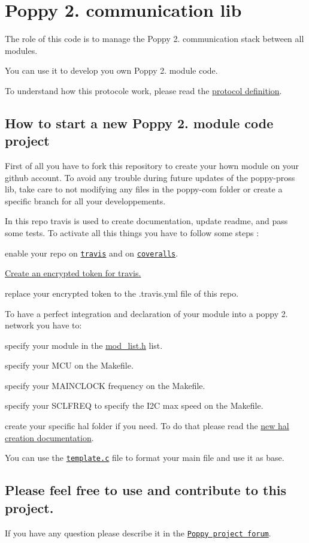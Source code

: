 \section*{Poppy 2. communication lib }

The role of this code is to manage the Poppy 2. communication stack between all modules.

You can use it to develop you own Poppy 2. module code.

To understand how this protocole work, please read the \hyperlink{md_doc_protocol_definition}{protocol definition}.

\subsection*{How to start a new Poppy 2. module code project }

First of all you have to fork this repository to create your hown module on your github account. To avoid any trouble during future updates of the poppy-\/pross lib, take care to not modifying any files in the poppy-\/com folder or create a specific branch for all your developpements. 



In this repo travis is used to create documentation, update readme, and pass some tests. To activate all this things you have to follow some steps \-:
\begin{DoxyItemize}
\item enable your repo on \href{https://travis-ci.org/}{\tt travis} and on \href{https://coveralls.io}{\tt coveralls}.
\item \hyperlink{md_doc_travis_encrypt}{Create an encrypted token for travis.}
\item replace your encrypted token to the .travis.\-yml file of this repo.
\end{DoxyItemize}





To have a perfect integration and declaration of your module into a poppy 2. network you have to\-:
\begin{DoxyItemize}
\item specify your module in the \hyperlink{mod__list_8h_source}{mod\-\_\-list.\-h} list.
\item specify your M\-C\-U on the Makefile.
\item specify your M\-A\-I\-N\-C\-L\-O\-C\-K frequency on the Makefile.
\item specify your S\-C\-L\-F\-R\-E\-Q to specify the I2\-C max speed on the Makefile.
\item create your specific hal folder if you need. To do that please read the \hyperlink{md_doc_hal_creation}{new hal creation documentation}.
\end{DoxyItemize}

You can use the \href{template.c}{\tt template.\-c} file to format your main file and use it as base.





\subsection*{Please feel free to use and contribute to this project. }

If you have any question please describe it in the \href{https://forum.poppy-project.org}{\tt Poppy project forum}. 